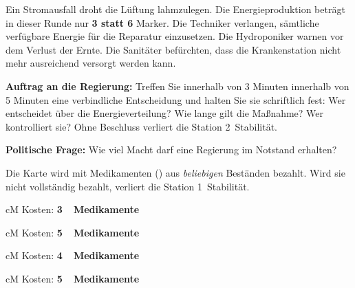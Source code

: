 \begin{eventbox}[title={Ereignis \ifkurz 2\else 3\fi: Der Notstand \hfill \normalfont Zeitpunkt: \ifkurz Runde 2, nach Beginn der Konferenz\else Runde 3, zu Beginn\fi},fonttitle=\bfseries]
Ein Stromausfall droht die Lüftung lahmzulegen. Die Energieproduktion beträgt in dieser Runde nur \textbf{3 statt 6} Marker. Die Techniker verlangen, sämtliche verfügbare Energie für die Reparatur einzusetzen. Die Hydroponiker warnen vor dem Verlust der Ernte. Die Sanitäter befürchten, dass die Krankenstation nicht mehr ausreichend versorgt werden kann.\par\smallskip
\textbf{Auftrag an die Regierung:} Treffen Sie \ifkurz innerhalb von 3 Minuten \else innerhalb von 5 Minuten \fi eine verbindliche Entscheidung und halten Sie sie schriftlich fest: Wer entscheidet über die Energieverteilung? Wie lange gilt die Maßnahme? Wer kontrolliert sie? Ohne Beschluss verliert die Station 2~Stabilität.\par\smallskip
\textbf{Politische Frage:} Wie viel Macht darf eine Regierung im Notstand erhalten?
\end{eventbox}

\clearpage
{}
Die Karte wird mit Medikamenten (\rM) aus \emph{beliebigen} Beständen bezahlt. Wird sie nicht vollständig bezahlt, verliert die Station 1~Stabilität.\par\medskip

\begin{schneidbox}[title={Krankheitskarte Runde 1: Grippewelle},fonttitle=\bfseries]{cM}
\Large Kosten: \textbf{3~\rM\ Medikamente}
\end{schneidbox}\par\medskip
\ifkurz
\begin{schneidbox}[title={Krankheitskarte Runde 2: Fieberausbruch},fonttitle=\bfseries]{cM}
\Large Kosten: \textbf{5~\rM\ Medikamente}
\end{schneidbox}
\else
\begin{schneidbox}[title={Krankheitskarte Runde 2: Wundinfektionen},fonttitle=\bfseries]{cM}
\Large Kosten: \textbf{4~\rM\ Medikamente}
\end{schneidbox}\par\medskip
\begin{schneidbox}[title={Krankheitskarte Runde 3: Fieberausbruch},fonttitle=\bfseries]{cM}
\Large Kosten: \textbf{5~\rM\ Medikamente}
\end{schneidbox}
\fi
